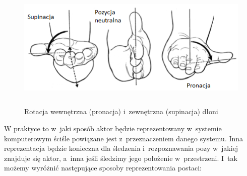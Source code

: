 \begin{savenotes}
	\begin{figure}[!htb]
		\centering	
		\includegraphics[height=6cm]{images/Wrist_joint_rotation.png}
		\caption{Rotacja wewnętrzna (pronacja) i~zewnętrzna (supinacja) dłoni}	
		\label{fig:literature:wristRotation}
	\end{figure}
\end{savenotes}
															
W praktyce to w~jaki sposób aktor będzie reprezentowany w~systemie komputerowym ściśle powiązane jest z~przeznaczeniem danego systemu. Inna reprezentacja będzie konieczna dla śledzenia i~rozpoznawania pozy w~jakiej znajduje się aktor, a~inna jeśli śledzimy jego położenie w~przestrzeni. I~tak możemy wyróżnić następujące sposoby reprezentowania postaci:
																
